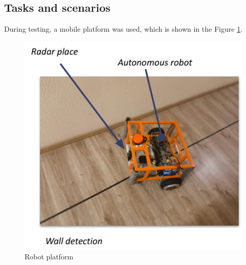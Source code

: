 





\subsection{Tasks and scenarios}

During testing, a mobile platform was used, which is shown in the Figure \ref{fig:platform}.


\begin{figure}
    \centering
    \includegraphics[width=0.5\linewidth]{Src//images/Robot.png}
    \caption{Robot platform}
    \label{fig:platform}
\end{figure}


